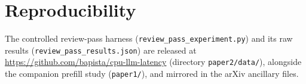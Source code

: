 \documentclass[10pt,twocolumn]{article}
\begin{document}
\section*{Reproducibility}
\label{sec:repro}
The controlled review-pass harness (\texttt{review\_pass\_experiment.py})
and its raw results (\texttt{review\_pass\_results.json}) are released at
\url{https://github.com/bapista/cpu-llm-latency} (directory
\texttt{paper2/data/}), alongside the companion prefill study
(\texttt{paper1/}), and mirrored in the arXiv ancillary files.



\end{document}

